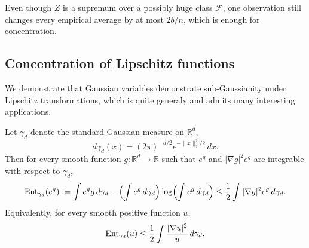 \begin{remark}
Even though $Z$ is a supremum over a possibly huge class $\mathcal F$, one observation still changes every empirical average by at most $2b/n$, which is enough for concentration.
\end{remark}

\subsection{Concentration of Lipschitz functions}
We demonstrate that Gaussian variables demonstrate sub-Gaussianity under Lipschitz transformations, which is quite generaly and admits many interesting applications.

\begin{thm}
Let $\gamma_d$ denote the standard Gaussian measure on $\mathbb{R}^d$,
\[
d\gamma_d(x)=(2\pi)^{-d/2}e^{-\|x\|_2^2/2}\,dx.
\]
Then for every smooth function $g:\mathbb{R}^d\to\mathbb{R}$ such that $e^g$ and $|\nabla g|^2e^g$
are integrable with respect to $\gamma_d$,
\[
\operatorname{Ent}_{\gamma_d}(e^g)
:=
\int e^g g\,d\gamma_d
-
\Bigl(\int e^g\,d\gamma_d\Bigr)
\log\Bigl(\int e^g\,d\gamma_d\Bigr)
\le
\frac12\int |\nabla g|^2e^g\,d\gamma_d.
\]
Equivalently, for every smooth positive function $u$,
\[
\operatorname{Ent}_{\gamma_d}(u)
\le
\frac12\int \frac{|\nabla u|^2}{u}\,d\gamma_d.
\]
\end{thm}

